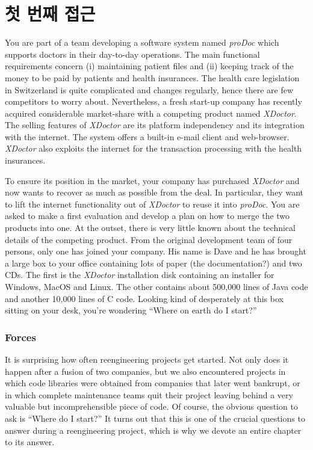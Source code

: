 \documentclass[a4paper,10pt,twoside]{book}
\begin{document}
	\renewcommand{\nnbb}[2]{} %
	\sloppy
\fi
\chapter{첫 번째 접근}

You are part of a team developing a software system named \emph{proDoc} which supports doctors in their day-to-day operations.
The main functional requirements concern (i) maintaining patient files and (ii) keeping track of the money to be paid by patients and health insurances. The health care legislation in Switzerland is quite complicated and changes regularly, hence there are few competitors to worry about. Nevertheless, a fresh start-up company has recently acquired considerable market-share with a competing product named \emph{XDoctor}. The selling features of \emph{XDoctor} are its platform independency and its integration with the internet. The system offers a built-in e-mail client and web-browser. \emph{XDoctor} also exploits the internet for the transaction processing with the health insurances.

To ensure its position in the market, your company has purchased \emph{XDoctor} and now wants to recover as much as possible from the deal. In particular, they want to lift the internet functionality out of \emph{XDoctor} to reuse it into \emph{proDoc}. You are asked to make a first evaluation and develop a plan on how to merge the two products into one. At the outset, there is very little known about the technical details of the competing product. From the original development team of four persons, only one has joined your company. His name is Dave and he has brought a large box to your office containing lots of paper (the documentation?) and two CDs. The first is the \emph{XDoctor} installation disk containing an installer for Windows, MacOS and Linux. The other contains about 500,000 lines of Java code and another 10,000 lines of C code. Looking kind of desperately at this box sitting on your desk, you're wondering ``Where on earth do I start?''

\subsection*{Forces}

It is surprising how often reengineering projects get started. Not only does it happen after a fusion of two companies, but we also encountered projects in which code libraries were obtained from companies that later went bankrupt, or in which complete maintenance teams quit their project leaving behind a very valuable but incomprehensible piece of code. Of course, the obvious question to ask is ``Where do I start?'' It turns out that this is one of the crucial questions to answer during a reengineering project, which is why we devote an entire chapter to its answer.
\end{document}
